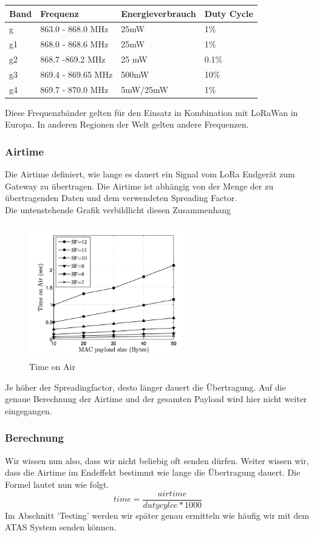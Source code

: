 \documentclass[11pt,english,german]{report}
\theoremstyle{definition}
\begin{document}
\begin{tabularx}{\linewidth}{XXXX}
	\textbf{Band} & \textbf{Frequenz} & \textbf{Energieverbrauch} & \textbf{Duty Cycle} \\ \hline
	g &863.0 - 868.0 MHz & 25mW&1\%\\ \hline
	g1 &868.0 - 868.6 MHz & 25mW& 1\%\\ \hline
	g2 &868.7 -869.2 MHz & 25 mW& 0.1\%\\ \hline
	g3 &869.4 - 869.65 MHz & 500mW& 10\%\\ \hline
	g4 &869.7 - 870.0 MHz & 5mW/25mW& 1\%\\ \hline
\end{tabularx} 
\noindent
Diese Frequenzbänder gelten für den Einsatz in Kombination mit LoRaWan in Europa. In anderen Regionen der Welt gelten andere Frequenzen.

\newpage
\subsubsection{Airtime}
Die Airtime definiert, wie lange es dauert ein Signal vom LoRa Endgerät zum Gateway zu übertragen. Die Airtime ist abhängig von der Menge der zu übertragenden Daten und dem verwendeten Spreading Factor.\\[0.3cm]
Die untenstehende Grafik verbildlicht diesen Zusammenhang
\begin{figure}[H]
	\centering
	\includegraphics[width=0.6\textwidth]{img/system/timeonair.png}
	\caption[Time on Air]
	{Time on Air}
\end{figure}
\noindent
Je höher der Spreadingfactor, desto länger dauert die Übertragung. Auf die genaue Berechnung der Airtime und der gesamten Payload wird hier nicht weiter eingegangen.

\subsubsection{Berechnung}
Wir wissen nun also, dass wir nicht beliebig oft senden dürfen. Weiter wissen wir, dass die Airtime im Endeffekt bestimmt wie lange die Übertragung dauert. Die Formel lautet nun wie folgt.
\begin{equation*}time = \frac{airtime}{dutycylce * 1000}\end{equation*}
Im Abschnitt 'Testing' werden wir später genau ermitteln wie häufig wir mit dem ATAS System senden können.
\end{document}
